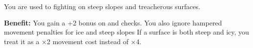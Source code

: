 
You are used to fighting on steep slopes and treacherous surfaces.

\textbf{Benefit:} You gain a +2 bonus on  and  checks. You also ignore hampered movement penalties for ice and steep slopes If a surface is both steep and icy, you treat it as a ×2 movement cost instead of ×4.